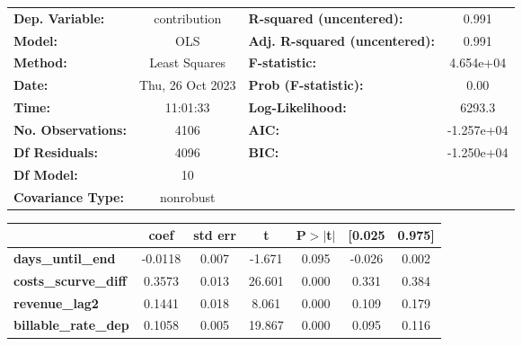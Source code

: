 \begin{center}
\begin{tabular}{lclc}
\toprule
\textbf{Dep. Variable:}                   &   contribution   & \textbf{  R-squared (uncentered):}      &     0.991   \\
\textbf{Model:}                           &       OLS        & \textbf{  Adj. R-squared (uncentered):} &     0.991   \\
\textbf{Method:}                          &  Least Squares   & \textbf{  F-statistic:       }          & 4.654e+04   \\
\textbf{Date:}                            & Thu, 26 Oct 2023 & \textbf{  Prob (F-statistic):}          &     0.00    \\
\textbf{Time:}                            &     11:01:33     & \textbf{  Log-Likelihood:    }          &    6293.3   \\
\textbf{No. Observations:}                &        4106      & \textbf{  AIC:               }          & -1.257e+04  \\
\textbf{Df Residuals:}                    &        4096      & \textbf{  BIC:               }          & -1.250e+04  \\
\textbf{Df Model:}                        &          10      & \textbf{                     }          &             \\
\textbf{Covariance Type:}                 &    nonrobust     & \textbf{                     }          &             \\
\bottomrule
\end{tabular}
\begin{tabular}{lcccccc}
                                          & \textbf{coef} & \textbf{std err} & \textbf{t} & \textbf{P$> |$t$|$} & \textbf{[0.025} & \textbf{0.975]}  \\
\midrule
\textbf{days\_until\_end}                 &      -0.0118  &        0.007     &    -1.671  &         0.095        &       -0.026    &        0.002     \\
\textbf{costs\_scurve\_diff}              &       0.3573  &        0.013     &    26.601  &         0.000        &        0.331    &        0.384     \\
\textbf{revenue\_lag2}                    &       0.1441  &        0.018     &     8.061  &         0.000        &        0.109    &        0.179     \\
\textbf{billable\_rate\_dep}              &       0.1058  &        0.005     &    19.867  &         0.000        &        0.095    &        0.116     \\

\end{tabular}
\end{center}
